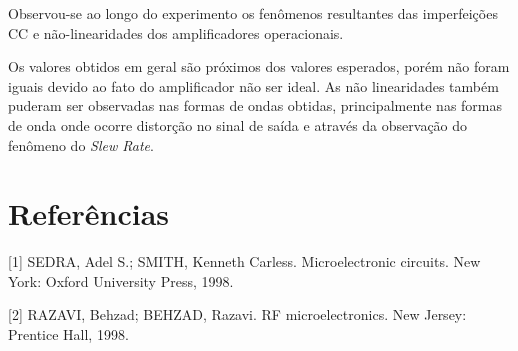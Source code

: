 \documentclass{abntex2}
\begin{document}
Observou-se ao longo do experimento os fenômenos resultantes das imperfeições CC e não-linearidades dos amplificadores operacionais.

Os valores obtidos em geral são próximos dos valores esperados, porém não foram iguais devido ao fato do amplificador não ser ideal. As não linearidades também puderam ser observadas nas formas de ondas obtidas, principalmente nas formas de onda onde ocorre distorção no sinal de saída e através da observação do fenômeno do \emph{Slew Rate}.

\clearpage

\section*{Referências}

[1] SEDRA, Adel S.; SMITH, Kenneth Carless. Microelectronic circuits. New York: Oxford University Press, 1998.

[2] RAZAVI, Behzad; BEHZAD, Razavi. RF microelectronics. New Jersey: Prentice Hall, 1998.
\end{document}
